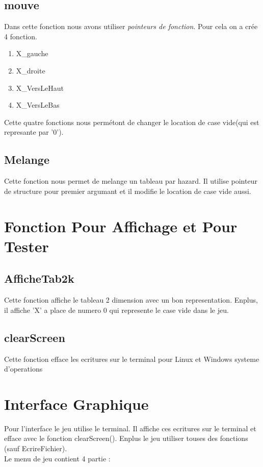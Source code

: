 \documentclass{article}
\begin{document}
\subsection{mouve}
Dans cette fonction nous avons utiliser \textit{pointeurs de fonction}. Pour cela on a crée 4 fonction.	

\begin{enumerate}
	\item X\_gauche 			
	\item X\_droite 			
	\item X\_VersLeHaut		
	\item X\_VersLeBas		
\end{enumerate}

Cette quatre fonctions nous permétont de changer le location de case vide(qui est represante par '0'). 
	

\subsection{Melange}
Cette fonction nous permet de melange un tableau par hazard. Il utilise pointeur de structure pour premier argumant et il modifie le location de case vide aussi.

\newpage

\section{Fonction Pour Affichage et Pour Tester}

\subsection{AfficheTab2k}
Cette fonction affiche le tableau 2 dimension avec un bon representation. Enplus, il affiche 'X' a place de numero 0 qui represente le case vide dans le jeu.

\subsection{clearScreen}
Cette fonction efface les ecritures sur le terminal pour Linux et Windows systeme d'operations

\section{Interface Graphique}
Pour l'interface le jeu utilise le terminal. Il affiche ces ecritures sur le terminal et efface avec le fonction clearScreen(). Enplus le jeu utiliser touses des fonctions (sauf EcrireFichier).
\\
Le menu de jeu contient 4 partie :
\end{document}
